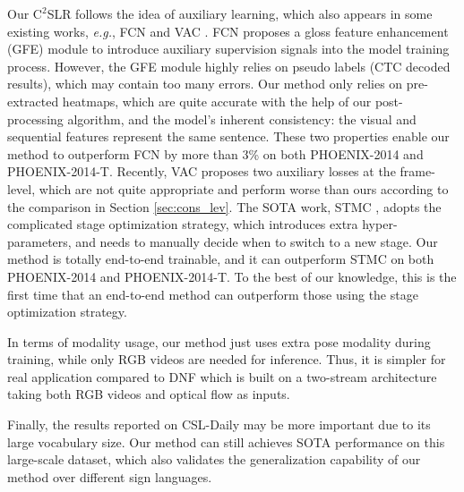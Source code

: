 \documentclass[acmsmall,screen]{acmart}
\def\eg{\emph{e.g.}} \def\Eg{\emph{E.g.}}
\begin{document}
Our $\text{C}^2$SLR follows the idea of auxiliary learning, which also appears in some existing works, \eg, FCN \cite{fcn} and VAC \cite{vac}.
FCN proposes a gloss feature enhancement (GFE) module to introduce auxiliary supervision signals into the model training process.
However, the GFE module highly relies on pseudo labels (CTC decoded results), which may contain too many errors.
Our method only relies on pre-extracted heatmaps, which are quite accurate with the help of our post-processing algorithm, and the model's inherent consistency: the visual and sequential features represent the same sentence.
These two properties enable our method to outperform FCN by more than 3\% on both PHOENIX-2014 and PHOENIX-2014-T.
Recently, VAC proposes two auxiliary losses at the frame-level, which are not quite appropriate and perform worse than ours according to the comparison in Section \ref{sec:cons_lev}.
The SOTA work, STMC \cite{stmc}, adopts the complicated stage optimization strategy, which introduces extra hyper-parameters, and needs to manually decide when to switch to a new stage.
Our method is totally end-to-end trainable, and it can outperform STMC on both PHOENIX-2014 and PHOENIX-2014-T.
To the best of our knowledge, this is the first time that an end-to-end method can outperform those using the stage optimization strategy.

In terms of modality usage, our method just uses extra pose modality during training, while only RGB videos are needed for inference.
Thus, it is simpler for real application compared to DNF \cite{dnf} which is built on a two-stream architecture taking both RGB videos and optical flow as inputs.

Finally, the results reported on CSL-Daily may be more important due to its large vocabulary size.
Our method can still achieves SOTA performance on this large-scale dataset, which also validates the generalization capability of our method over different sign languages.
\end{document}
